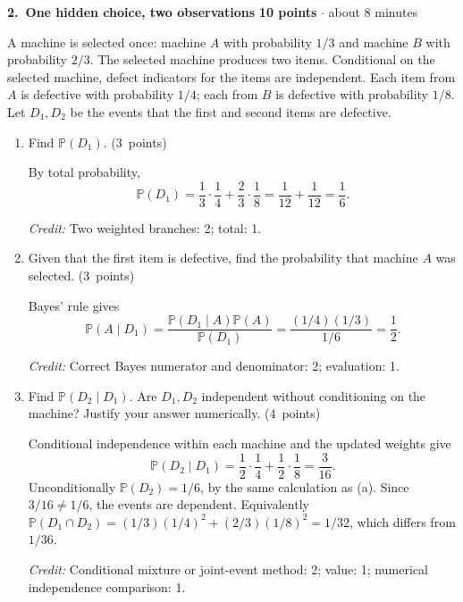 \documentclass[11pt,letterpaper]{article}
\newcommand{\Prob}{\mathbb P}
\newcommand{\partpts}[1]{\unskip\nobreak\hspace{.3em}%
  \mbox{\small\color{muted}(#1 points)}}
\newcommand{\credit}[1]{\par{\footnotesize\color{muted}\textit{Credit:} #1}}
\newcommand{\problem}[4]{\par\addvspace{8pt}%
  {\large\bfseries\color{indigo}#1.\ #2}\hfill
  {\small\color{muted}\textbf{#3 points} $\cdot$ about #4 minutes}\par\nobreak}
\begin{document}
\newpage
\problem{2}{One hidden choice, two observations}{10}{8}
A machine is selected once: machine $A$ with probability $1/3$ and machine
$B$ with probability $2/3$. The selected machine produces two items.
Conditional on the selected machine, defect indicators for the items are
independent. Each item from $A$ is defective with probability $1/4$;
each from $B$ is defective with probability $1/8$.
Let $D_1,D_2$ be the events that the first and second items are defective.
\begin{enumerate}
\item Find $\Prob(D_1)$. \partpts{3}
\begin{solution}[1.25in]
By total probability,
\[
\Prob(D_1)=\frac13\cdot\frac14+\frac23\cdot\frac18
=\frac1{12}+\frac1{12}=\frac16.
\]
\credit{Two weighted branches: 2; total: 1.}
\end{solution}
\item Given that the first item is defective, find the probability that
machine $A$ was selected. \partpts{3}
\begin{solution}[1.4in]
Bayes' rule gives
\[
\Prob(A\mid D_1)=\frac{\Prob(D_1\mid A)\Prob(A)}{\Prob(D_1)}
=\frac{(1/4)(1/3)}{1/6}=\frac12.
\]
\credit{Correct Bayes numerator and denominator: 2; evaluation: 1.}
\end{solution}
\item Find $\Prob(D_2\mid D_1)$. Are $D_1,D_2$ independent without
conditioning on the machine? Justify your answer numerically. \partpts{4}
\begin{solution}[1.8in]
Conditional independence within each machine and the updated weights give
\[
\Prob(D_2\mid D_1)=\frac12\cdot\frac14+\frac12\cdot\frac18
=\frac3{16}.
\]
Unconditionally $\Prob(D_2)=1/6$, by the same calculation as (a).
Since $3/16\ne1/6$, the events are dependent.
Equivalently $\Prob(D_1\cap D_2)=(1/3)(1/4)^2+(2/3)(1/8)^2=1/32$,
which differs from $1/36$.
\credit{Conditional mixture or joint-event method: 2; value: 1;
numerical independence comparison: 1.}
\end{solution}
\end{enumerate}
\end{document}
